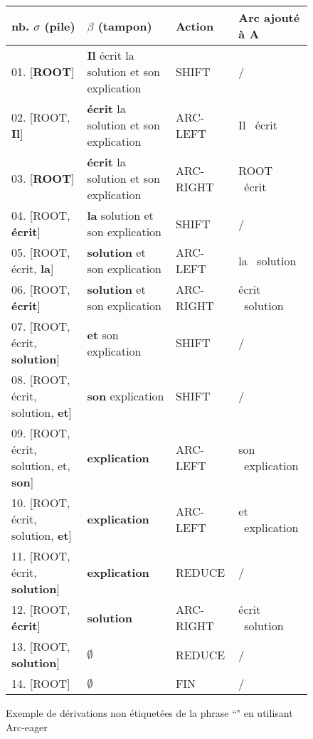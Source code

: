 \documentclass{KodeBook}
\begin{document}
\begin{figure}[ht]
		\centering\footnotesize
	\begin{tabular}{llll}
		\hline\hline
		nb. $\sigma$ (pile) & $\beta$ (tampon) & Action & Arc ajouté à A \\
		\hline
		01. [\textbf{ROOT}] & \textbf{Il} écrit la solution et son explication & SHIFT & / \\
		02. [ROOT, \textbf{Il}] & \textbf{écrit} la solution et son explication & ARC-LEFT & Il \textleftarrow\ écrit\\
		03. [\textbf{ROOT}] & \textbf{écrit} la solution et son explication & ARC-RIGHT & ROOT \textrightarrow\ écrit\\	
		04. [ROOT, \textbf{écrit}] & \textbf{la} solution et son explication & SHIFT & / \\	
		05. [ROOT, écrit, \textbf{la}] & \textbf{solution} et son explication & ARC-LEFT & la \textleftarrow\ solution \\
		06. [ROOT, \textbf{écrit}] & \textbf{solution} et son explication & ARC-RIGHT & écrit \textrightarrow\ solution \\
		07. [ROOT, écrit, \textbf{solution}] & \textbf{et} son explication & SHIFT & / \\
		08. [ROOT, écrit, solution, \textbf{et}] & \textbf{son} explication & SHIFT & / \\
		09. [ROOT, écrit, solution, et, \textbf{son}] & \textbf{explication} & ARC-LEFT & son \textleftarrow\ explication \\
		10. [ROOT, écrit, solution, \textbf{et}] & \textbf{explication} & ARC-LEFT & et \textleftarrow\ explication\\	
		11. [ROOT, écrit, \textbf{solution}] & \textbf{explication} & REDUCE & /\\
		12. [ROOT, \textbf{écrit}] & \textbf{solution} & ARC-RIGHT & écrit \textrightarrow\ solution\\
		13. [ROOT, \textbf{solution}] & $\emptyset$ & REDUCE & / \\
		14. [ROOT] & $\emptyset$ & FIN & / \\
		\hline\hline
	\end{tabular}
	\caption[Exemple de dérivations non étiquetées en utilisant Arc-eager]{Exemple de dérivations non étiquetées de la phrase ``" en utilisant Arc-eager\label{fig:arc-eager-exp}}
\end{figure}
\end{document}

